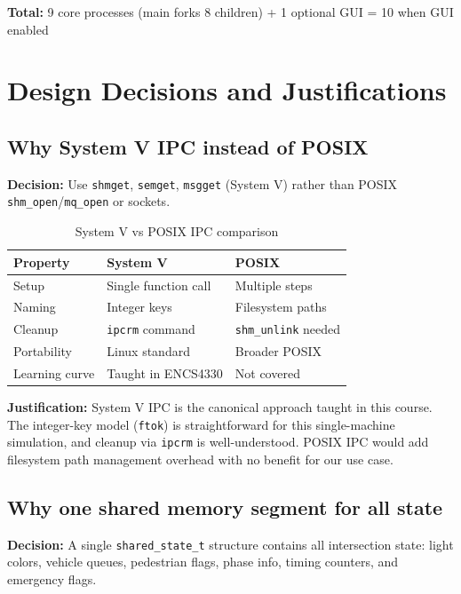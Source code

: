 \documentclass[11pt,a4paper]{article}
\begin{document}
\textbf{Total:} 9 core processes (main forks 8 children) + 1 optional GUI = 10 when GUI enabled

\newpage
\section{Design Decisions and Justifications}

\subsection{Why System V IPC instead of POSIX}

\textbf{Decision:} Use \texttt{shmget}, \texttt{semget}, \texttt{msgget} (System V) rather than POSIX \texttt{shm\_open}/\texttt{mq\_open} or sockets.

\begin{table}[H]
\centering
\begin{tabular}{|l|l|l|}
\hline
\textbf{Property} & \textbf{System V} & \textbf{POSIX} \\ \hline
Setup & Single function call & Multiple steps \\ \hline
Naming & Integer keys & Filesystem paths \\ \hline
Cleanup & \texttt{ipcrm} command & \texttt{shm\_unlink} needed \\ \hline
Portability & Linux standard & Broader POSIX \\ \hline
Learning curve & Taught in ENCS4330 & Not covered \\ \hline
\end{tabular}
\caption{System V vs POSIX IPC comparison}
\end{table}

\textbf{Justification:} System V IPC is the canonical approach taught in this course. The integer-key model (\texttt{ftok}) is straightforward for this single-machine simulation, and cleanup via \texttt{ipcrm} is well-understood. POSIX IPC would add filesystem path management overhead with no benefit for our use case.

\subsection{Why one shared memory segment for all state}

\textbf{Decision:} A single \texttt{shared\_state\_t} structure contains all intersection state: light colors, vehicle queues, pedestrian flags, phase info, timing counters, and emergency flags.
\end{document}
